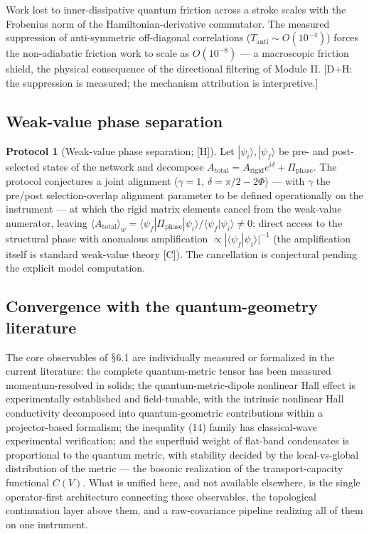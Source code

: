 \documentclass[11pt]{article}
\theoremstyle{definition}
\newtheorem{protocol}{Protocol}
\theoremstyle{plain}
\begin{document}
Work lost to inner-dissipative quantum friction across a stroke scales with the
Frobenius norm of the Hamiltonian-derivative commutator. The measured suppression
of anti-symmetric off-diagonal correlations ($T_{\mathrm{anti}} \sim
O(10^{-4})$) forces the non-adiabatic friction work to scale as $O(10^{-8})$ --- a
macroscopic friction shield, the physical consequence of the directional filtering
of Module II. [D$+$H: the suppression is measured; the mechanism attribution is
interpretive.]

\subsection{Weak-value phase separation}

\begin{protocol}[Weak-value phase separation; {[H]}]
Let $|\psi_i\rangle, |\psi_f\rangle$ be pre- and post-selected states of the
network and decompose $A_{\mathrm{total}} = A_{\mathrm{rigid}}e^{i\delta} +
\Pi_{\mathrm{phase}}$. The protocol conjectures a joint alignment
($\gamma = 1$, $\delta = \pi/2 - 2\Phi$) --- with $\gamma$ the pre/post
selection-overlap alignment parameter to be defined operationally on the instrument
--- at which the rigid matrix elements cancel from the weak-value numerator,
leaving $\langle A_{\mathrm{total}}\rangle_w = \langle\psi_f|\Pi_{\mathrm{phase}}
|\psi_i\rangle/\langle\psi_f|\psi_i\rangle \neq 0$: direct access to the structural
phase with anomalous amplification $\propto |\langle\psi_f|\psi_i\rangle|^{-1}$
(the amplification itself is standard weak-value theory [C]). The cancellation is
conjectural pending the explicit model computation.
\end{protocol}

\subsection{Convergence with the quantum-geometry literature}

The core observables of $\mathsection$6.1 are individually measured or formalized in the
current literature: the complete quantum-metric tensor has been measured
momentum-resolved in solids; the quantum-metric-dipole nonlinear Hall effect is
experimentally established and field-tunable, with the intrinsic nonlinear Hall
conductivity decomposed into quantum-geometric contributions within a
projector-based formalism; the inequality (14) family has classical-wave
experimental verification; and the superfluid weight of flat-band condensates is
proportional to the quantum metric, with stability decided by the
local-vs-global distribution of the metric --- the bosonic realization of the
transport-capacity functional $C(V)$. What is unified here, and not available
elsewhere, is the single operator-first architecture connecting these observables,
the topological continuation layer above them, and a raw-covariance pipeline
realizing all of them on one instrument.
\end{document}
